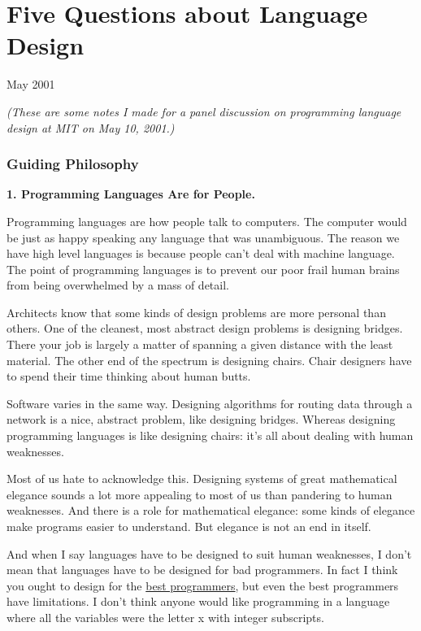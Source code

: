 \chapter{Five Questions about Language Design}

May 2001

\emph{(These are some notes I made for a panel discussion on programming
language design at MIT on May 10, 2001.)}

\subsection{Guiding Philosophy}\label{guiding-philosophy}

\textbf{1. Programming Languages Are for People.}

Programming languages are how people talk to computers. The computer
would be just as happy speaking any language that was unambiguous. The
reason we have high level languages is because people can't deal with
machine language. The point of programming languages is to prevent our
poor frail human brains from being overwhelmed by a mass of detail.

Architects know that some kinds of design problems are more personal
than others. One of the cleanest, most abstract design problems is
designing bridges. There your job is largely a matter of spanning a
given distance with the least material. The other end of the spectrum is
designing chairs. Chair designers have to spend their time thinking
about human butts.

Software varies in the same way. Designing algorithms for routing data
through a network is a nice, abstract problem, like designing bridges.
Whereas designing programming languages is like designing chairs: it's
all about dealing with human weaknesses.

Most of us hate to acknowledge this. Designing systems of great
mathematical elegance sounds a lot more appealing to most of us than
pandering to human weaknesses. And there is a role for mathematical
elegance: some kinds of elegance make programs easier to understand. But
elegance is not an end in itself.

And when I say languages have to be designed to suit human weaknesses, I
don't mean that languages have to be designed for bad programmers. In
fact I think you ought to design for the \href{design.html}{best
programmers}, but even the best programmers have limitations. I don't
think anyone would like programming in a language where all the
variables were the letter x with integer subscripts.

